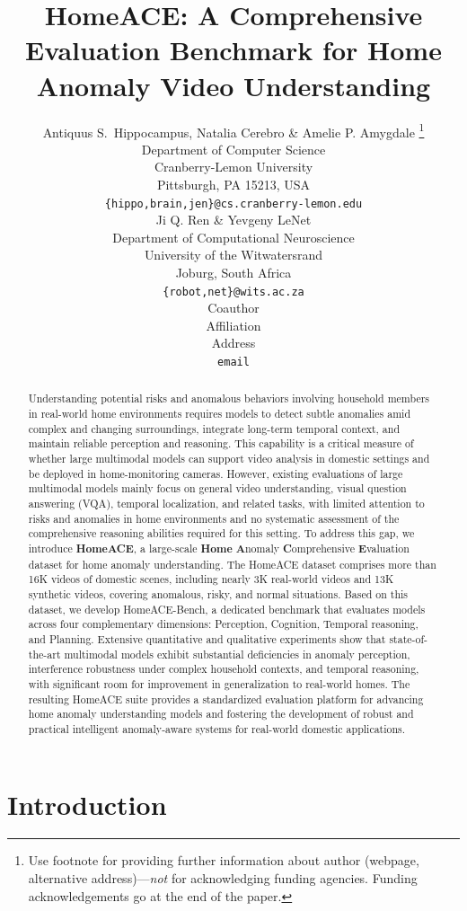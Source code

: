 \documentclass{article} %
\title{HomeACE: A Comprehensive Evaluation Benchmark for Home Anomaly Video Understanding}
\author{Antiquus S.~Hippocampus, Natalia Cerebro \& Amelie P. Amygdale \thanks{ Use footnote for providing further information
about author (webpage, alternative address)---\emph{not} for acknowledging
funding agencies.  Funding acknowledgements go at the end of the paper.} \\
Department of Computer Science\\
Cranberry-Lemon University\\
Pittsburgh, PA 15213, USA \\
\texttt{\{hippo,brain,jen\}@cs.cranberry-lemon.edu} \\
\And
Ji Q. Ren \& Yevgeny LeNet \\
Department of Computational Neuroscience \\
University of the Witwatersrand \\
Joburg, South Africa \\
\texttt{\{robot,net\}@wits.ac.za} \\
\AND
Coauthor \\
Affiliation \\
Address \\
\texttt{email}
}
\begin{document}
\maketitle

\begin{abstract}
Understanding potential risks and anomalous behaviors involving household members in real-world home environments requires models to detect subtle anomalies amid complex and changing surroundings, integrate long-term temporal context, and maintain reliable perception and reasoning. This capability is a critical measure of whether large multimodal models can support video analysis in domestic settings and be deployed in home-monitoring cameras. However, existing evaluations of large multimodal models mainly focus on general video understanding, visual question answering (VQA), temporal localization, and related tasks, with limited attention to risks and anomalies in home environments and no systematic assessment of the comprehensive reasoning abilities required for this setting. To address this gap, we introduce \textbf{HomeACE}, a large-scale \textbf{Home} \textbf{A}nomaly \textbf{C}omprehensive \textbf{E}valuation dataset for home anomaly understanding. The HomeACE dataset comprises more than 16K videos of domestic scenes, including nearly 3K real-world videos and 13K synthetic videos, covering anomalous, risky, and normal situations. Based on this dataset, we develop HomeACE-Bench, a dedicated benchmark that evaluates models across four complementary dimensions: Perception, Cognition, Temporal reasoning, and Planning. Extensive quantitative and qualitative experiments show that state-of-the-art multimodal models exhibit substantial deficiencies in anomaly perception, interference robustness under complex household contexts, and temporal reasoning, with significant room for improvement in generalization to real-world homes. The resulting HomeACE suite provides a standardized evaluation platform for advancing home anomaly understanding models and fostering the development of robust and practical intelligent anomaly-aware systems for real-world domestic applications.
\end{abstract}

\section{Introduction}
\end{document}
